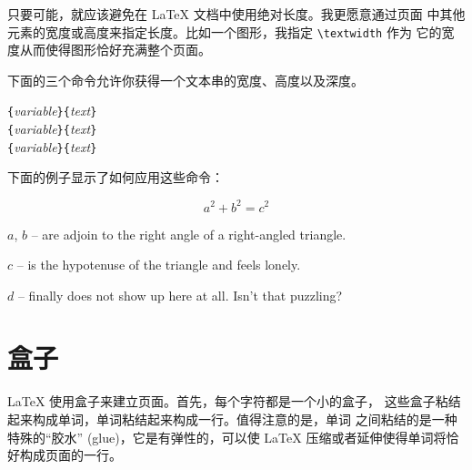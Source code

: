 只要可能，就应该避免在 \LaTeX{} 文档中使用绝对长度。我更愿意通过页面
中其他元素的宽度或高度来指定长度。比如一个图形，我指定 \verb|\textwidth| 作为
它的宽度从而使得图形恰好充满整个页面。

下面的三个命令允许你获得一个文本串的宽度、高度以及深度。

\begin{lscommand}
\verb|{|\emph{variable}\verb|}{|\emph{text}\verb|}|\\
\verb|{|\emph{variable}\verb|}{|\emph{text}\verb|}|\\
\verb|{|\emph{variable}\verb|}{|\emph{text}\verb|}|
\end{lscommand}

\noindent 下面的例子显示了如何应用这些命令：
\begin{example}
\flushleft
\newenvironment{vardesc}[1]{%
  \settowidth{\parindent}{#1:\ }
  \makebox[0pt][r]{#1:\ }}{}

\begin{displaymath}
a^2+b^2=c^2
\end{displaymath}

\begin{vardesc}{Where}$a$,
$b$ -- are adjoin to the right
angle of a right-angled triangle.

$c$ -- is the hypotenuse of
the triangle and feels lonely.

$d$ -- finally does not show up
here at all. Isn't that puzzling?
\end{vardesc}
\end{example}


\section{盒子}
\LaTeX{} 使用盒子来建立页面。首先，每个字符都是一个小的盒子，
这些盒子粘结起来构成单词，单词粘结起来构成一行。值得注意的是，单词
之间粘结的是一种特殊的“胶水” (glue)，它是有弹性的，可以使 \LaTeX{} 压缩或者延伸使得单词将恰好构成页面的一行。

